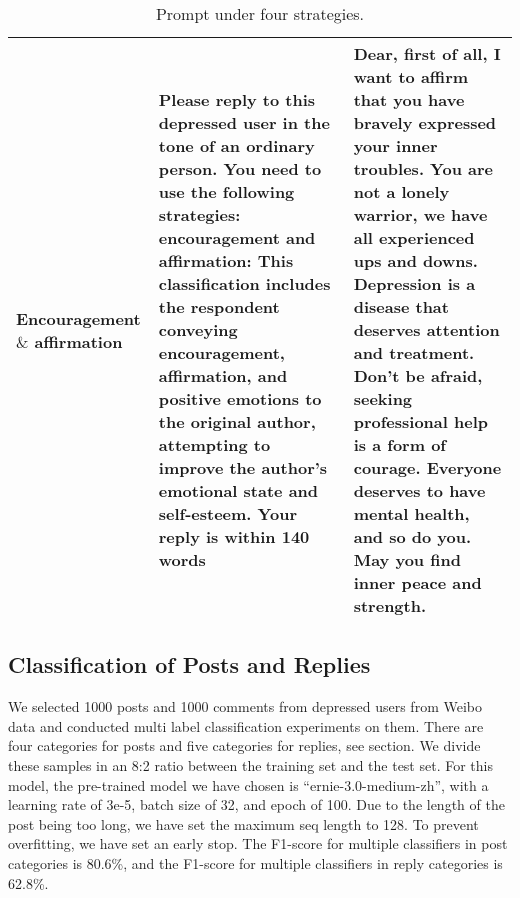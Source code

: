 \begin{table*}[th]
\begin{tabular}{p{}|p{}|p{}}
        Encouragement \( \mbox{\&} \) affirmation & Please reply to this depressed user in the tone of an ordinary person. You need to use the following strategies: encouragement and affirmation: This classification includes the respondent conveying encouragement, affirmation, and positive emotions to the original author, attempting to improve the author's emotional state and self-esteem. Your reply is within 140 words & Dear, first of all, I want to affirm that you have bravely expressed your inner troubles. You are not a lonely warrior, we have all experienced ups and downs. Depression is a disease that deserves attention and treatment. Don't be afraid, seeking professional help is a form of courage. Everyone deserves to have mental health, and so do you. May you find inner peace and strength.  \\ \midrule
	\end{tabular}
	\caption{Prompt under four strategies.}
	\label{tab:prompt}
\end{table*}


\subsection{Classification of Posts and Replies}
\label{apd:classify_details}

We selected 1000 posts and 1000 comments from depressed users from Weibo data and conducted multi label classification experiments on them. There are four categories for posts and five categories for replies, see section. We divide these samples in an 8:2 ratio between the training set and the test set. For this model, the pre-trained model we have chosen is ``ernie-3.0-medium-zh'', with a learning rate of 3e-5, batch size of 32, and epoch of 100. Due to the length of the post being too long, we have set the maximum seq length to 128. To prevent overfitting, we have set an early stop. The F1-score for multiple classifiers in post categories is 80.6\%, and the F1-score for multiple classifiers in reply categories is 62.8\%.


